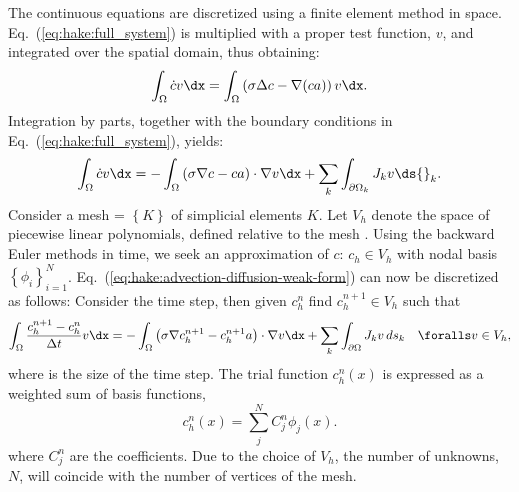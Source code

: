 The continuous equations are discretized using a finite element method
in space. Eq.~(\ref{eq:hake:full_system}) is multiplied with a proper
test function, $v$, and integrated over the spatial domain, thus
obtaining:
\begin{equation}
  \label{eq:hake:advection-diffusion-weak-form-0}
  \int_\Omega\dot{c}v \dx = \int_\Omega \left(\sigma\Delta c-\nabla(ca)\right) v \dx.
\end{equation}
Integration by parts, together with the boundary conditions in
Eq.~(\ref{eq:hake:full_system}), yields:
\begin{equation}
  \label{eq:hake:advection-diffusion-weak-form}
  \int_\Omega\dot{c}v \dx = -\int_\Omega \left(\sigma\nabla c-ca\right)\cdot\nabla v \dx + \sum_k\int_{\partial\Omega_k} J_kv \ds{}_k.
\end{equation}
Consider a mesh \T = $\left\{K\right\}$ of simplicial elements
$K$. Let $V_h$ denote the space of piecewise linear polynomials,
defined relative to the mesh \T. Using the backward Euler methods in
time, we seek an approximation of $c$: $c_h\in V_h$ with nodal basis
$\left\{\phi_i\right\}^N_{i=1}$. Eq.~(\ref{eq:hake:advection-diffusion-weak-form})
can now be discretized as follows: Consider the \nth time step, then
given $c_h^n$ find $c_h^{n+1} \in V_h$ such that
\begin{equation}
  \label{eq:hake:advection-diffusion-weak-discrete-form}
  \int_{\Omega} \frac{c_h^{n+1}-c_h^{n}}{\Dt}v \dx = -\int_{\Omega} \left(\sigma\nabla c_h^{n+1}-c_h^{n+1}a\right)\cdot\nabla v \dx + \sum_k\int_{\partial\Omega} J_kv\,ds_{k}\quad\foralls v \in V_h,
\end{equation}
where \Dt is the size of the time step. The trial function $c^n_h(x)$
is expressed as a weighted sum of basis functions,
\begin{equation}
  \label{eq:hake:discrete-solution}
  c^n_h(x) = \sum^N_j C_j^n\phi_j(x).
\end{equation}
where $C_j^n$ are the coefficients. Due to the choice of $V_h$, the
number of unknowns, $N$, will coincide with the number of vertices of
the mesh.

